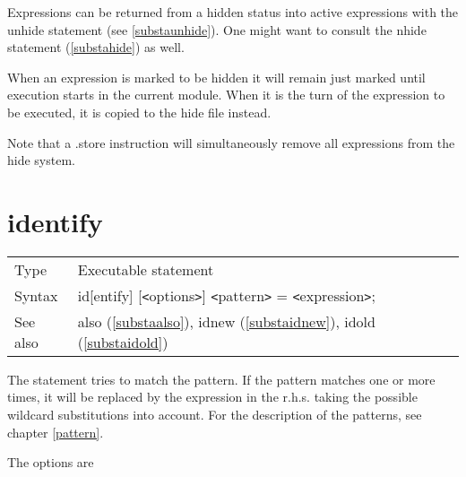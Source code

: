 \noindent Expressions can be returned from a hidden status into active 
expressions with the unhide statement (see 
\ref{substaunhide}). One might want to consult the nhide 
statement (\ref{substahide}) as well. \vspace{4mm}

\noindent When an expression is marked to be hidden it will remain just 
marked until execution starts in the current module. When it is the turn of 
the expression to be executed, it is copied to the hide file instead. 
\vspace{4mm}

\noindent Note that a .store instruction will simultaneously remove all 
expressions from the hide system. \vspace{10mm}


\section{identify}
\label{substaidentify}

\noindent \begin{tabular}{ll}
Type & Executable statement\\
Syntax & id[entify] [{\tt<}options{\tt>}] {\tt<}pattern{\tt>} = {\tt<}expression{\tt>};
\\ See also & also (\ref{substaalso}),
              idnew (\ref{substaidnew}),
              idold (\ref{substaidold})
\end{tabular}\vspace{4mm}

\noindent The statement tries to match the 
pattern. If the pattern matches one or more times, it will 
be replaced by the expression in the r.h.s. taking the possible 
wildcard substitutions into account. For the description of 
the patterns, see chapter \ref{pattern}.

\noindent The options are \vspace{1mm}



